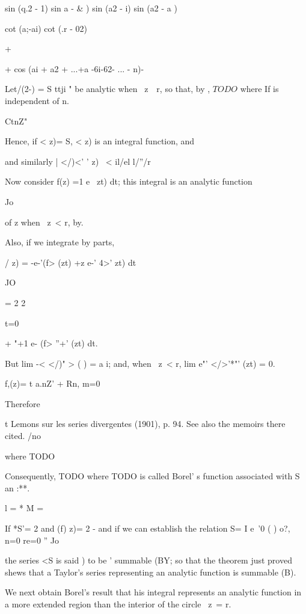 {sin (q.2 - 1)    sin a - \& ) sin (a2 - i)  sin (a2 - a )

cot (a;-ai) cot (.r - 02)

+

+ cos (ai + a2 + ...+a -6i-62- ... - n)-


Let/(2-) = S ttji " be analytic when \ z\ \ r, so that, by
,
$
TODO
$
where If is independent of n.

CtnZ"

Hence, if < z)= S, < z) is an integral function, and

and similarly | </)<' ' z) \ < il/el l/''/r

Now consider f(z) =1 e~ zt) dt; this integral is an analytic function

Jo

of z when \ z\ < r, by.

Also, if we integrate by parts,

/ z) = -e-'(f> (zt) +z e-' 4>' zt) dt

JO

= 2 2

 t=0

+ "+1 e- (f> ''+' (zt) dt.

But lim -< </)" > ( ) = a i; and, when \ z\ < r, lim e"' </>'*"' (zt)
= 0.

f,(z)= t a.nZ' + Rn, m=0

Therefore

t Lemons sur les series divergentes (1901), p. 94. See also the
memoirs there cited.
%
%
/no

where TODO

Consequently, TODO
where TODO is called Borel' s function associated with S
an :**.

 l = *  M =

If *S'= 2 and (f) z)= 2 - and if we can establish the relation S= I
e~'0 ( ) o?, n=0 re=0 ''  Jo

the series <S is said ) to be ' summable (BY; so that the
theorem just proved shews that a Taylor's series representing an
analytic function is summable (B).


We next obtain Borel's result that his integral represents an analytic
function in a more extended region than the interior of the circle \
z\ = r.

}
